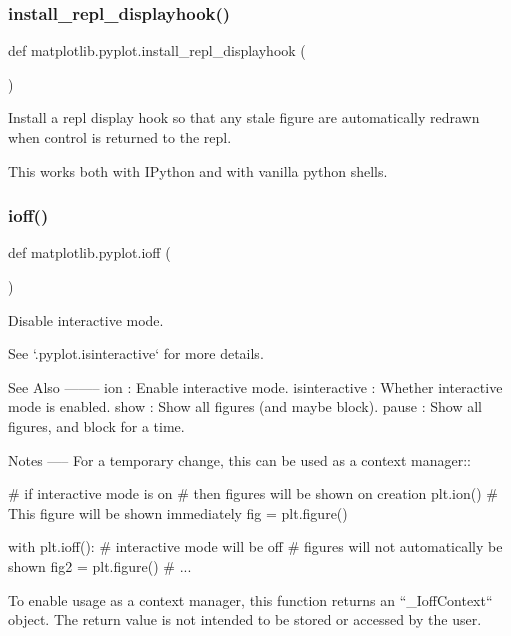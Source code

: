 \subsubsection{\texorpdfstring{install\+\_\+repl\+\_\+displayhook()}{install\_repl\_displayhook()}}
{\footnotesize\ttfamily def matplotlib.\+pyplot.\+install\+\_\+repl\+\_\+displayhook (\begin{DoxyParamCaption}{ }\end{DoxyParamCaption})}

\begin{DoxyVerb}Install a repl display hook so that any stale figure are automatically
redrawn when control is returned to the repl.

This works both with IPython and with vanilla python shells.
\end{DoxyVerb}
 \mbox{\label{namespacematplotlib_1_1pyplot_afe399bc78857cdcc346b70651fae94b7}} 
\subsubsection{\texorpdfstring{ioff()}{ioff()}}
{\footnotesize\ttfamily def matplotlib.\+pyplot.\+ioff (\begin{DoxyParamCaption}{ }\end{DoxyParamCaption})}

\begin{DoxyVerb}Disable interactive mode.

See `.pyplot.isinteractive` for more details.

See Also
--------
ion : Enable interactive mode.
isinteractive : Whether interactive mode is enabled.
show : Show all figures (and maybe block).
pause : Show all figures, and block for a time.

Notes
-----
For a temporary change, this can be used as a context manager::

    # if interactive mode is on
    # then figures will be shown on creation
    plt.ion()
    # This figure will be shown immediately
    fig = plt.figure()

    with plt.ioff():
        # interactive mode will be off
        # figures will not automatically be shown
        fig2 = plt.figure()
        # ...

To enable usage as a context manager, this function returns an
``_IoffContext`` object. The return value is not intended to be stored
or accessed by the user.
\end{DoxyVerb}
 \mbox{\label{namespacematplotlib_1_1pyplot_ac6b08ebe91174772ff5b33ea38b66ebd}} 
